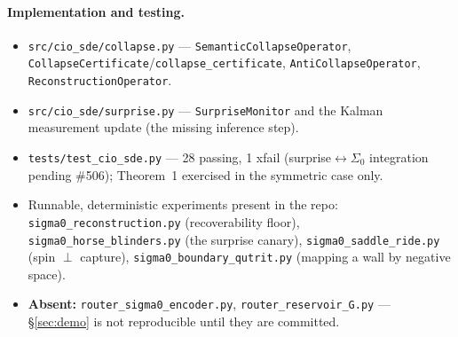 \documentclass[11pt]{article}
\theoremstyle{definition}
\begin{document}
\paragraph{Implementation and testing.}
\begin{itemize}
\item \texttt{src/cio\_sde/collapse.py} --- \texttt{SemanticCollapseOperator},
  \texttt{CollapseCertificate}/\texttt{collapse\_certificate}, \texttt{AntiCollapseOperator},
  \texttt{ReconstructionOperator}.
\item \texttt{src/cio\_sde/surprise.py} --- \texttt{SurpriseMonitor} and the Kalman
  measurement update (the missing inference step).
\item \texttt{tests/test\_cio\_sde.py} --- 28 passing, 1 xfail (surprise$\leftrightarrow\Sigma_0$
  integration pending \#506); Theorem~1 exercised in the symmetric case only.
\item Runnable, deterministic experiments present in the repo:
  \texttt{sigma0\_reconstruction.py} (recoverability floor),
  \texttt{sigma0\_horse\_blinders.py} (the surprise canary),
  \texttt{sigma0\_saddle\_ride.py} (spin $\perp$ capture),
  \texttt{sigma0\_boundary\_qutrit.py} (mapping a wall by negative space).
\item \textbf{Absent:} \texttt{router\_sigma0\_encoder.py},
  \texttt{router\_reservoir\_G.py} --- \S\ref{sec:demo} is not reproducible until
  they are committed.
\end{itemize}
\end{document}
